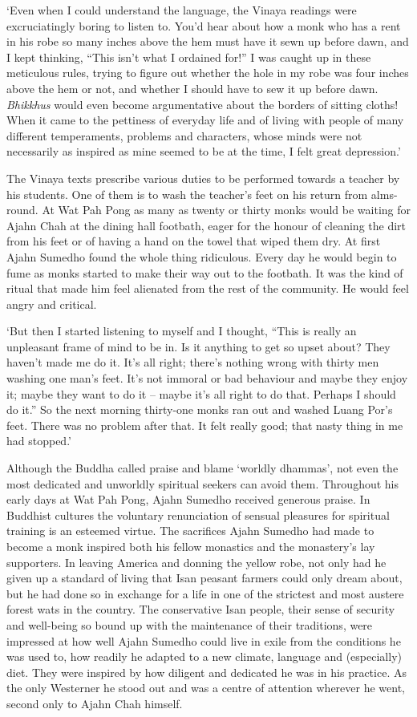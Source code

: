 `Even when I could understand the language, the Vinaya readings were
excruciatingly boring to listen to. You'd hear about how a monk who has a
rent in his robe so many inches above the hem must have it sewn up
before dawn, and I kept thinking, ``This isn't what I ordained for!'' I
was caught up in these meticulous rules, trying to figure out whether
the hole in my robe was four inches above the hem or not, and whether I
should have to sew it up before dawn. \emph{Bhikkhus} would even become
argumentative about the borders of sitting cloths! When it came to the
pettiness of everyday life and of living with people of many different
temperaments, problems and characters, whose minds were not necessarily
as inspired as mine seemed to be at the time, I felt great depression.'

The Vinaya texts prescribe various duties to be performed towards a
teacher by his students. One of them is to wash the teacher's feet on
his return from alms-round. At Wat Pah Pong as many as twenty or thirty
monks would be waiting for Ajahn Chah at the dining hall footbath, eager
for the honour of cleaning the dirt from his feet or of having a hand on
the towel that wiped them dry. At first Ajahn Sumedho found the whole
thing ridiculous. Every day he would begin to fume as monks started to
make their way out to the footbath. It was the kind of ritual that made
him feel alienated from the rest of the community. He would feel angry
and critical. 

`But then I started listening to myself and I thought, 
``This is really an unpleasant frame of mind to be in. Is it anything to
get so upset about? They haven't made me do it. It's all right; there's
nothing wrong with thirty men washing one man's feet. It's not immoral
or bad behaviour and maybe they enjoy it; maybe they want to do it --
maybe it's all right to do that. Perhaps I should do it.'' So the next
morning thirty-one monks ran out and washed Luang Por's feet. There was
no problem after that. It felt really good; that nasty thing in me had
stopped.'

Although the Buddha called praise and blame `worldly dhammas', not even
the most dedicated and unworldly spiritual seekers can avoid them. 
Throughout his early days at Wat Pah Pong, Ajahn Sumedho received
generous praise. In Buddhist cultures the voluntary renunciation of
sensual pleasures for spiritual training is an esteemed virtue. The
sacrifices Ajahn Sumedho had made to become a monk inspired both his
fellow monastics and the monastery's lay supporters. In leaving America
and donning the yellow robe, not only had he given up a standard of
living that Isan peasant farmers could only dream about, but he had done
so in exchange for a life in one of the strictest and most austere
forest wats in the country. The conservative Isan people, their sense of
security and well-being so bound up with the maintenance of their
traditions, were impressed at how well Ajahn Sumedho could live in exile
from the conditions he was used to, how readily he adapted to a new
climate, language and (especially) diet. They were inspired by how
diligent and dedicated he was in his practice. As the only Westerner he
stood out and was a centre of attention wherever he went, second only to
Ajahn Chah himself. 

